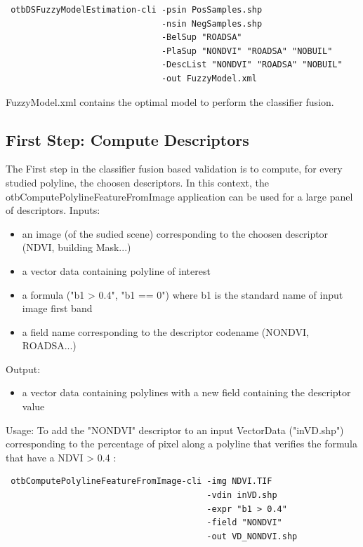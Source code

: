 \begin{verbatim}
 otbDSFuzzyModelEstimation-cli -psin PosSamples.shp 
                               -nsin NegSamples.shp 
                               -BelSup "ROADSA" 
                               -PlaSup "NONDVI" "ROADSA" "NOBUIL" 
                               -DescList "NONDVI" "ROADSA" "NOBUIL" 
                               -out FuzzyModel.xml
\end{verbatim}

FuzzyModel.xml contains the optimal model to perform the classifier fusion.

\subsection{First Step: Compute Descriptors}

The First step in the classifier fusion based validation is to compute, for every studied polyline, the choosen descriptors. In this context, the otbComputePolylineFeatureFromImage application can be used for a large panel of descriptors.
Inputs:
\begin{itemize}
\item an image (of the sudied scene) corresponding to the choosen descriptor (NDVI, building Mask...)
\item a vector data containing polyline of interest
\item a formula ("b1 > 0.4", "b1 == 0") where b1 is the standard name of input image first band
\item a field name corresponding to the descriptor codename (NONDVI, ROADSA...)
\end{itemize}
Output:
\begin{itemize}
\item a vector data containing polylines with a new field containing the descriptor value
\end{itemize}
Usage: To add the "NONDVI" descriptor to an input VectorData ("inVD.shp") corresponding to the percentage of pixel along a polyline that verifies the formula that have a NDVI > 0.4 :

\begin{verbatim}
 otbComputePolylineFeatureFromImage-cli -img NDVI.TIF 
                                        -vdin inVD.shp 
                                        -expr "b1 > 0.4" 
                                        -field "NONDVI" 
                                        -out VD_NONDVI.shp
\end{verbatim}

